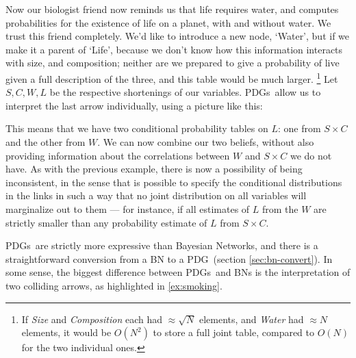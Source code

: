 \documentclass{article}
\newcommand{\MN}{PDG}
\newcommand{\MNs}{\MN s}
\begin{document}
\begin{example}
		Now our biologist friend now reminds us that life requires water, and computes probabilities for the existence of life on a planet, with and without water. We trust this friend completely. We'd like to introduce a new node, `Water', but if we make it a parent of `Life', because we don't know how this information interacts with size, and composition; neither are we prepared to give a probability of live given a full description of the three, and this table would be much larger.%
			\footnote{If \textit{Size} and \textit{Composition} each had $\approx\sqrt{N}$ elements, and \textit{Water} had $\approx N$ elements, it would be $O(N^2)$ to store a full joint table, compared to $O(N)$ for the two individual ones.} %
		Let $S, C, W, L$ be the respective shortenings of our variables.
		\MNs\ allow us to interpret the last arrow individually, using a picture like this:

		\begin{center}
		\end{center}
	
		This means that we have two conditional probability tables on $L$: one from $S \times C$ and the other from $W$. We can now combine our two beliefs, without also providing information about the correlations between $W$ and $S\times C$ we do not have. As with the previous example, there is now a possibility of being inconsistent, in the sense that is possible to specify the conditional distributions in the links in such a way that no joint distribution on all variables will marginalize out to them --- for instance, if all estimates of $L$ from the $W$ are strictly smaller than any probability estimate of $L$ from $S \times C$.
	\end{example}
	
	\MNs\ are strictly more expressive than Bayesian Networks, and there is a straightforward conversion from a BN to a \MN\ (section \ref{sec:bn-convert}). 
	In some sense, the biggest difference between \MNs\ and BNs is the interpretation of two colliding arrows, as highlighted in \cref{ex:smoking}.
	
\end{document}

